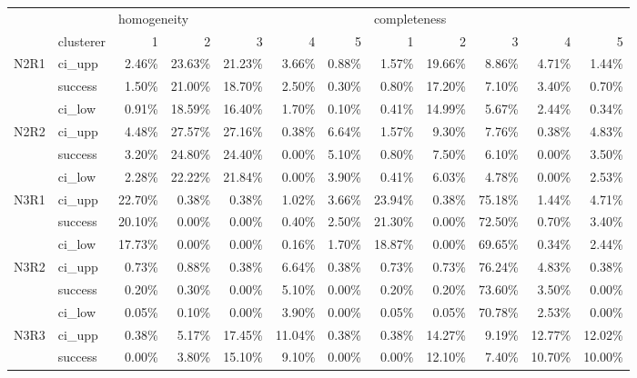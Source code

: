 \begin{tabular}{llrrrrrrrrrr}
\toprule
     & {} & \multicolumn{5}{l}{homogeneity} & \multicolumn{5}{l}{completeness} \\
     & clusterer &           1 &      2 &      3 &      4 &      5 &            1 &      2 &      3 &      4 &      5 \\
\midrule
N2R1 & ci\_upp &       2.46\% & 23.63\% & 21.23\% &  3.66\% &  0.88\% &        1.57\% & 19.66\% &  8.86\% &  4.71\% &  1.44\% \\
     & success &       1.50\% & 21.00\% & 18.70\% &  2.50\% &  0.30\% &        0.80\% & 17.20\% &  7.10\% &  3.40\% &  0.70\% \\
     & ci\_low &       0.91\% & 18.59\% & 16.40\% &  1.70\% &  0.10\% &        0.41\% & 14.99\% &  5.67\% &  2.44\% &  0.34\% \\
N2R2 & ci\_upp &       4.48\% & 27.57\% & 27.16\% &  0.38\% &  6.64\% &        1.57\% &  9.30\% &  7.76\% &  0.38\% &  4.83\% \\
     & success &       3.20\% & 24.80\% & 24.40\% &  0.00\% &  5.10\% &        0.80\% &  7.50\% &  6.10\% &  0.00\% &  3.50\% \\
     & ci\_low &       2.28\% & 22.22\% & 21.84\% &  0.00\% &  3.90\% &        0.41\% &  6.03\% &  4.78\% &  0.00\% &  2.53\% \\
N3R1 & ci\_upp &      22.70\% &  0.38\% &  0.38\% &  1.02\% &  3.66\% &       23.94\% &  0.38\% & 75.18\% &  1.44\% &  4.71\% \\
     & success &      20.10\% &  0.00\% &  0.00\% &  0.40\% &  2.50\% &       21.30\% &  0.00\% & 72.50\% &  0.70\% &  3.40\% \\
     & ci\_low &      17.73\% &  0.00\% &  0.00\% &  0.16\% &  1.70\% &       18.87\% &  0.00\% & 69.65\% &  0.34\% &  2.44\% \\
N3R2 & ci\_upp &       0.73\% &  0.88\% &  0.38\% &  6.64\% &  0.38\% &        0.73\% &  0.73\% & 76.24\% &  4.83\% &  0.38\% \\
     & success &       0.20\% &  0.30\% &  0.00\% &  5.10\% &  0.00\% &        0.20\% &  0.20\% & 73.60\% &  3.50\% &  0.00\% \\
     & ci\_low &       0.05\% &  0.10\% &  0.00\% &  3.90\% &  0.00\% &        0.05\% &  0.05\% & 70.78\% &  2.53\% &  0.00\% \\
N3R3 & ci\_upp &       0.38\% &  5.17\% & 17.45\% & 11.04\% &  0.38\% &        0.38\% & 14.27\% &  9.19\% & 12.77\% & 12.02\% \\
     & success &       0.00\% &  3.80\% & 15.10\% &  9.10\% &  0.00\% &        0.00\% & 12.10\% &  7.40\% & 10.70\% & 10.00\% \\

\end{tabular}

